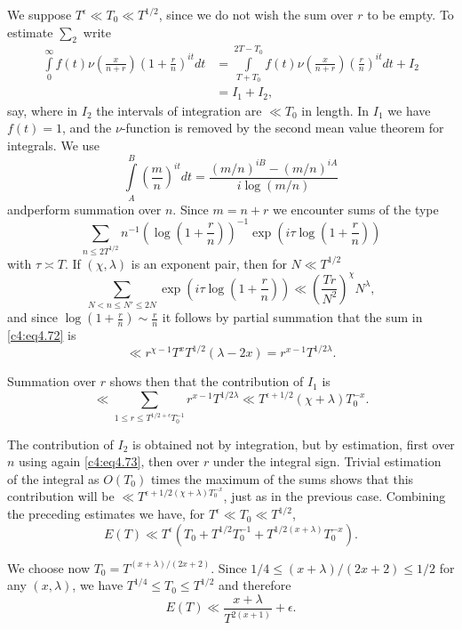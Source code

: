 We suppose $T^\epsilon \ll T_0 \ll T^{1/2}$, since we do not wish the
sum over $r$ to be empty. To estimate $\sum_2$ write
\begin{align*}
  \int\limits_0^\infty f(t) \nu \left(\frac{x}{n+r}\right) \left(1+
  \frac{r}{n}\right)^{it} dt & = \int\limits_{T+ T_0}^{2T-T_0} f(t)
  \nu \left(\frac{x}{n+r} \right) \left(\frac{r}{n} \right)^{it} dt +
  I_2\\
  & = I_1 + I_2,
\end{align*}
say, where in $I_2$ the intervals of integration are $\ll T_0$ in
length. In $I_1$ we have $f(t)=1$, and the $\nu$-function is removed
by the second mean value theorem for integrals. We use
$$
\int\limits_A^B \left(\frac{m}{n}\right)^{it} dt = \frac{(m/n)^{iB} -
  (m/n)^{iA}}{i \log (m/n)}
$$
and\pageoriginale perform summation over $n$. Since $m=n +r$ we
encounter sums of the type 
\begin{equation}
  \sum_{n \leq 2 T^{1/2}} n^{-1} \left(\log \left(1+ \frac{r}{n} \right) \right)^{-1} \exp \left(i
  \tau \log \left(1+ \frac{r}{n} \right) \right)\label{c4:eq4.72} 
\end{equation}
with $\tau \asymp T$. If $(\chi, \lambda)$ is an exponent pair, then
for $N \ll T^{1/2}$
\begin{equation}
  \sum_{N < n \leq N' \leq 2N} \exp \left(i \tau \log \left(1+ \frac{r}{n}\right) \right) \ll
  \left(\frac{Tr}{N^2} \right)^\chi N^\lambda,\label{c4:eq4.73}
\end{equation}
and since $\log \left(1+ \frac{r}{n} \right) \sim \frac{r}{n}$ it follows by
partial summation that the sum in \eqref{c4:eq4.72} is 
$$
\ll r^{\chi -1} T^x T^{1/2} (\lambda- 2 x) = r^{x-1}T^{1/2 \lambda}.
$$

Summation over $r$ shows then that the contribution of $I_1$ is 
$$
\ll \sum_{1 \leq r \leq  T^{1/2+ \epsilon}T_0^{-1}} 
r^{x-1}T^{1/2\lambda} \ll T^{\epsilon + 1/2} (\chi+ \lambda) T^{-x}_0.
$$

The contribution of $I_2$ is obtained not by integration, but by
estimation, first over $n$ using again \eqref{c4:eq4.73}, then over
$r$ under the integral sign. Trivial estimation of the integral as
$O(T_0)$ times the maximum of the sums shows that this contribution
will be $\ll T^{\epsilon + 1/2(\chi+\lambda)T_0^{-x}}$, just as in
the previous case. Combining the preceding estimates we have, for
$T^\epsilon \ll T_0 \ll T^{1/2}$,
$$
E(T) \ll T^\epsilon \left(T_0+ T^{1/2} T^{-1}_0 + T^{1/2 (x+
  \lambda)}T_0^{-x} \right). 
$$

We choose now $T_0 = T^{(x+\lambda)/(2 x+2)}$. Since $1/4 \leq
(x+\lambda) /(2x+2)\leq 1/2$ for any $(x, \lambda)$, we have
$T^{1/4} \leq T_0 \leq T^{1/2}$ and therefore
\begin{equation}
  E(T) \ll \frac{x+ \lambda}{T^{2(x+1)}}+   \epsilon. \label{c4:eq4.74}  
\end{equation}

